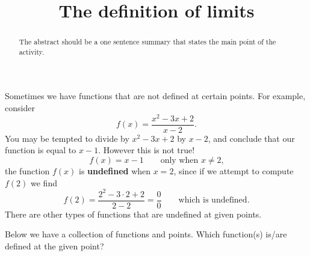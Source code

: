 \documentclass{ximera}
\title{The definition of limits}
\begin{document}
\begin{abstract}
  The abstract should be a one sentence summary that states the main point of the activity.
\end{abstract}
\maketitle


Sometimes we have functions that are not defined at certain
points. For example, consider
\[
f(x) = \frac{x^2 - 3x + 2}{x-2}.
\]
You may be tempted to divide by $x^2 - 3x + 2$ by $x-2$, and conclude
that our function is equal to $x-1$. However this is not true!
\[
f(x) = x-1 \qquad\text{only when $x\ne 2$,}
\]
the function $f(x)$ is \textbf{undefined} when $x= 2$, since if we
attempt to compute $f(2)$ we find
\[
f(2) = \frac{2^2-3\cdot 2+2}{2-2} = \frac{0}{0}\qquad\text{which is  undefined}.
\]
There are other types of functions that are undefined at given points. 

\begin{question}
  Below we have a collection of functions and points. Which
  function(s) is/are defined at the given point?
\begin{solution}
\begin{multiple-choice}
\end{multiple-choice}
\end{solution}
\end{question}
\end{document}

